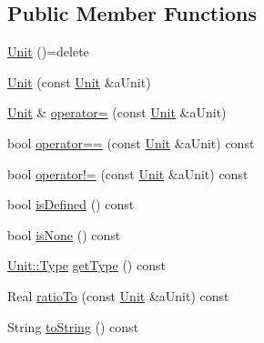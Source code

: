 \subsection*{Public Member Functions}
\begin{DoxyCompactItemize}
\item 
\hyperlink{classlibrary_1_1physics_1_1_unit_a66553fce18dea002e4f9841cc985363c}{Unit} ()=delete
\item 
\hyperlink{classlibrary_1_1physics_1_1_unit_a14a1b42d1d979179e04983218bd1e061}{Unit} (const \hyperlink{classlibrary_1_1physics_1_1_unit}{Unit} \&a\+Unit)
\item 
\hyperlink{classlibrary_1_1physics_1_1_unit}{Unit} \& \hyperlink{classlibrary_1_1physics_1_1_unit_af82a0c6b4bb9b9724823b6492c72aa46}{operator=} (const \hyperlink{classlibrary_1_1physics_1_1_unit}{Unit} \&a\+Unit)
\item 
bool \hyperlink{classlibrary_1_1physics_1_1_unit_a026f9b92c14aef78e7f73ac7a6baa9af}{operator==} (const \hyperlink{classlibrary_1_1physics_1_1_unit}{Unit} \&a\+Unit) const
\item 
bool \hyperlink{classlibrary_1_1physics_1_1_unit_a2fc9c3b0ac228c6c0fedb2f63274a35f}{operator!=} (const \hyperlink{classlibrary_1_1physics_1_1_unit}{Unit} \&a\+Unit) const
\item 
bool \hyperlink{classlibrary_1_1physics_1_1_unit_a6b02591316b1ccb0599a7c71bc8cbcee}{is\+Defined} () const
\item 
bool \hyperlink{classlibrary_1_1physics_1_1_unit_a0d08993fcb83ad73a3155a883b1357bd}{is\+None} () const
\item 
\hyperlink{classlibrary_1_1physics_1_1_unit_ab01b0024991fd80f3e5ef7c8282fccc1}{Unit\+::\+Type} \hyperlink{classlibrary_1_1physics_1_1_unit_ac924d3a1abe03ba3ee0a05fdb3f1115f}{get\+Type} () const
\item 
Real \hyperlink{classlibrary_1_1physics_1_1_unit_a23f1befd7161e4f70e5cb84bb851c347}{ratio\+To} (const \hyperlink{classlibrary_1_1physics_1_1_unit}{Unit} \&a\+Unit) const
\item 
String \hyperlink{classlibrary_1_1physics_1_1_unit_a8c7c1e6ec7a16eeb446e956dd19a3fb8}{to\+String} () const
\end{DoxyCompactItemize}
